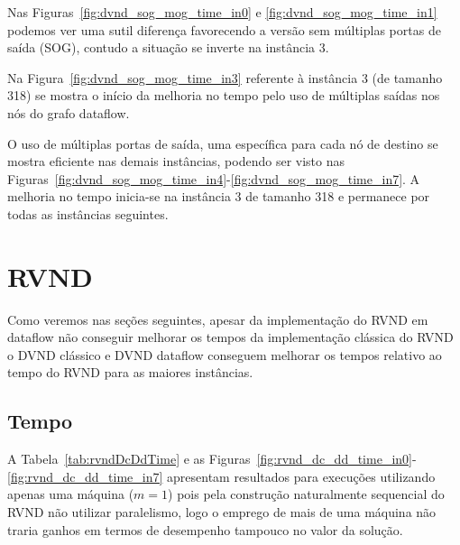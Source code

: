 
Nas Figuras~\ref{fig:dvnd_sog_mog_time_in0} e \ref{fig:dvnd_sog_mog_time_in1} podemos ver uma sutil diferença favorecendo a versão sem múltiplas portas de saída (SOG), contudo a situação se inverte na instância 3.



Na Figura~\ref{fig:dvnd_sog_mog_time_in3} referente à instância 3 (de tamanho 318) se mostra o início da melhoria no tempo pelo uso de múltiplas saídas nos nós do grafo dataflow.


O uso de múltiplas portas de saída, uma específica para cada nó de destino se mostra eficiente nas demais instâncias, podendo ser visto nas Figuras~\ref{fig:dvnd_sog_mog_time_in4}-\ref{fig:dvnd_sog_mog_time_in7}.
A melhoria no tempo inicia-se na instância 3 de tamanho 318 e permanece por todas as instâncias seguintes.




\section{RVND} \label{sec:resultadosRVND}

Como veremos nas seções seguintes, apesar da implementação do RVND em dataflow não conseguir melhorar os tempos da implementação clássica do RVND o DVND clássico e DVND dataflow conseguem melhorar os tempos relativo ao tempo do RVND para as maiores instâncias.

\subsection{Tempo}

A Tabela~\ref{tab:rvndDcDdTime} e as Figuras~\ref{fig:rvnd_dc_dd_time_in0}-\ref{fig:rvnd_dc_dd_time_in7} apresentam resultados para execuções utilizando apenas uma máquina ($m = 1$) pois pela construção naturalmente sequencial do RVND não utilizar paralelismo, logo o emprego de mais de uma máquina não traria ganhos em termos de desempenho tampouco no valor da solução.

